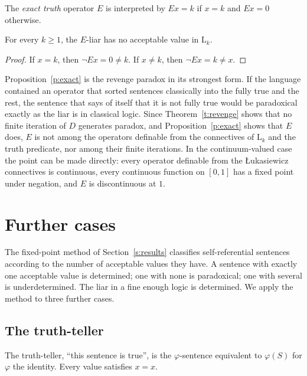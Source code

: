 \documentclass{situationist-preprint}
\begin{document}
\begin{definition}\label{d:E}
The \emph{exact truth} operator $E$ is interpreted by $E x = k$ if $x = k$ and $E x = 0$ otherwise.
\end{definition}

\begin{proposition}\label{p:exact}
For every $k \geq 1$, the $E$-liar has no acceptable value in $\mathrm{L}_k$.
\end{proposition}

\begin{proof}
If $x = k$, then $\neg E x = 0 \neq k$. If $x \neq k$, then $\neg E x = k \neq x$.
\end{proof}

Proposition~\ref{p:exact} is the revenge paradox in its strongest form. If the language contained an operator that sorted sentences classically into the fully true and the rest, the sentence that says of itself that it is not fully true would be paradoxical exactly as the liar is in classical logic. Since Theorem~\ref{t:revenge} shows that no finite iteration of $D$ generates paradox, and Proposition~\ref{p:exact} shows that $E$ does, $E$ is not among the operators definable from the connectives of $\mathrm{L}_k$ and the truth predicate, nor among their finite iterations. In the continuum-valued case the point can be made directly: every operator definable from the Łukasiewicz connectives is continuous, every continuous function on $[0,1]$ has a fixed point under negation, and $E$ is discontinuous at $1$.

\section{Further cases}\label{s:cases}

The fixed-point method of Section~\ref{s:results} classifies self-referential sentences according to the number of acceptable values they have. A sentence with exactly one acceptable value is determined; one with none is paradoxical; one with several is underdetermined. The liar in a fine enough logic is determined. We apply the method to three further cases.

\subsection{The truth-teller}

The truth-teller, \enquote{this sentence is true}, is the $\varphi$-sentence equivalent to $\varphi(S)$ for $\varphi$ the identity. Every value satisfies $x = x$.
\end{document}
